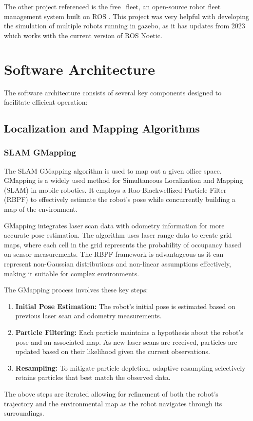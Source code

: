 \documentclass[a4paper,twocolumn]{article}
\begin{document}
The other project referenced is the free\_fleet, an open-source robot fleet management system built on ROS \cite{freefleet}. This project was very helpful with developing the simulation of multiple robots running in gazebo, as it has updates from 2023 which works with the current version of ROS Noetic. 


\section{Software Architecture}
The software architecture consists of several key components designed to facilitate efficient operation:

\subsection{Localization and Mapping Algorithms}
\subsubsection{SLAM GMapping}
\label{subsubsec:gmapping}
The SLAM GMapping algorithm is used to map out a given office space. GMapping is a widely used method for Simultaneous Localization and Mapping (SLAM) in mobile robotics. It employs a Rao-Blackwellized Particle Filter (RBPF) to effectively estimate the robot's pose while concurrently building a map of the environment\cite{grisetti2007improved}.

GMapping integrates laser scan data with odometry information for more accurate pose estimation. The algorithm uses laser range data to create grid maps, where each cell in the grid represents the probability of occupancy based on sensor measurements. The RBPF framework is advantageous as it can represent non-Gaussian distributions and non-linear assumptions effectively, making it suitable for complex environments.

The GMapping process involves these key steps\cite{grisetti2007improved}:
\begin{enumerate}
    \item \textbf{Initial Pose Estimation:} The robot's initial pose is estimated based on previous laser scan and odometry measurements.
    
    \item \textbf{Particle Filtering:} Each particle maintains a hypothesis about the robot's pose and an associated map. As new laser scans are received, particles are updated based on their likelihood given the current observations.
    
    \item \textbf{Resampling:} To mitigate particle depletion, adaptive resampling selectively retains particles that best match the observed data.
\end{enumerate}
The above steps are iterated allowing for refinement of both the robot's trajectory and the environmental map as the robot navigates through its surroundings.
\end{document}
